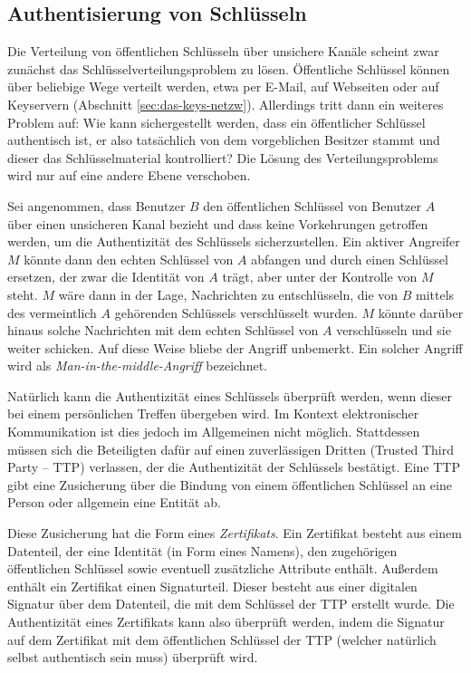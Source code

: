 \subsection{Authentisierung von Schlüsseln}
\label{ch:Grundlagen:sec:PublicKeyCrypto:subsec:KeyAuth}
Die Verteilung von öffentlichen Schlüsseln über unsichere
Kanäle scheint zwar zunächst das
Schlüsselverteilungsproblem zu lösen. Öffentliche Schlüssel
können über beliebige Wege verteilt werden, etwa per E-Mail, auf
Webseiten oder auf Keyservern (Abschnitt
\ref{sec:das-keys-netzw}). Allerdings tritt dann ein weiteres Problem
auf: Wie kann sichergestellt werden, dass ein öffentlicher
Schlüssel authentisch ist, er also tatsächlich von dem
vorgeblichen Besitzer stammt und dieser das Schlüsselmaterial
kontrolliert? Die Lösung des Verteilungsproblems wird nur auf eine
andere Ebene verschoben.

Sei angenommen, dass Benutzer $B$ den öffentlichen Schlüssel von
Benutzer $A$ über einen unsicheren Kanal bezieht und dass keine
Vorkehrungen getroffen werden, um die Authentizität des Schlüssels
sicherzustellen. Ein aktiver Angreifer $M$ könnte dann den echten
Schlüssel von $A$ abfangen und durch einen Schlüssel ersetzen, der
zwar die Identität von $A$ trägt, aber unter der Kontrolle von $M$
steht. $M$ wäre dann in der Lage, Nachrichten zu entschlüsseln, die
von $B$ mittels des vermeintlich $A$ gehörenden Schlüssels
verschlüsselt wurden. $M$ könnte darüber hinaus solche Nachrichten mit
dem echten Schlüssel von $A$ verschlüsseln und sie weiter
schicken. Auf diese Weise bliebe der Angriff unbemerkt. Ein solcher
Angriff wird als \emph{Man-in-the-middle-Angriff} bezeichnet.

Natürlich kann die Authentizität eines Schlüssels überprüft
werden, wenn dieser bei einem persönlichen Treffen übergeben
wird. Im Kontext elektronischer Kommunikation ist dies jedoch im
Allgemeinen nicht möglich. Stattdessen m\"ussen sich die Beteiligten dafür auf einen
zuverlässigen Dritten (Trusted Third Party -- TTP) verlassen,
der die Authentizität der Schlüssels bestätigt. Eine TTP gibt
eine Zusicherung über die Bindung von einem öffentlichen
Schlüssel an eine Person oder allgemein eine Entität ab.

Diese Zusicherung hat die Form eines \emph{Zertifikats}. Ein
Zertifikat besteht aus einem Datenteil, der eine Identität (in Form
eines Namens), den zugehörigen öffentlichen Schlüssel sowie
eventuell zusätzliche Attribute enthält. Außerdem enthält ein
Zertifikat einen Signaturteil. Dieser besteht aus einer digitalen
Signatur über dem Datenteil, die mit dem Schlüssel der TTP
erstellt wurde. Die Authentizität eines Zertifikats kann also
überprüft werden, indem die Signatur auf dem Zertifikat mit dem
öffentlichen Schlüssel der TTP (welcher natürlich selbst
authentisch sein muss) überprüft wird.

